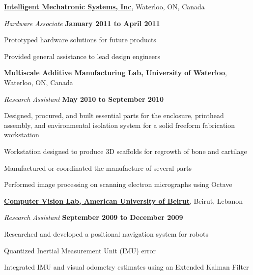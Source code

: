 \documentclass[10pt, a4paper]{article}
\begin{document}
\halfblankline

\href{http://www.intellimec.com/}{\textbf{Intelligent Mechatronic Systems, Inc}}, Waterloo, ON, Canada

\begin{outerlist}
\item[] \textit{Hardware Associate} \hfill \textbf{January 2011 to April 2011}
\begin{innerlist}
  \item Prototyped hardware solutions for future products
  \item Provided general assistance to lead design engineers
\end{innerlist}
\end{outerlist}

\halfblankline

\href{http://rpl.uwaterloo.ca/}{\textbf{Multiscale Additive Manufacturing Lab, University of Waterloo}}, Waterloo, ON, Canada

\begin{outerlist}
\item[] \textit{Research Assistant} \hfill \textbf{May 2010 to September 2010}
\begin{innerlist}
  \item Designed, procured, and built essential parts for the enclosure, printhead assembly, and environmental isolation system for a solid freeform fabrication workstation
  \item Workstation designed to produce 3D scaffolds for regrowth of bone and cartilage
  \item Manufactured or coordinated the manufacture of several parts
  \item Performed image processing on scanning electron micrographs using Octave
\end{innerlist}
\end{outerlist}

\halfblankline

\href{http://www.aub.edu.lb/fea/me/research_labs/cvl/Pages/home.aspx}{\textbf{Computer Vision Lab, American University of Beirut}}, Beirut, Lebanon

\begin{outerlist}
\item[] \textit{Research Assistant} \hfill \textbf{September 2009 to December 2009}
\begin{innerlist}
  \item Researched and developed a positional navigation system for robots
  \item Quantized Inertial Measurement Unit (IMU) error
  \item Integrated IMU and visual odometry estimates using an Extended Kalman Filter
\end{innerlist}
\end{outerlist}
\end{document}
